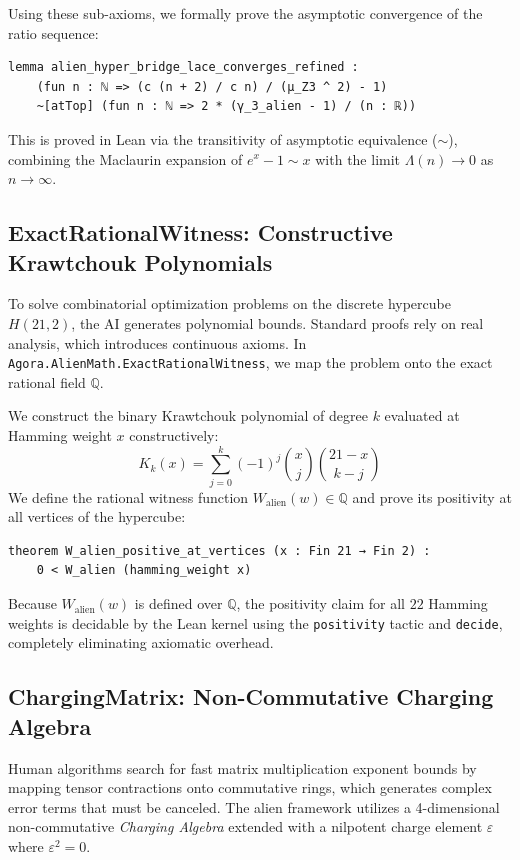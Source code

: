 \documentclass[11pt,a4paper]{article}
\begin{document}
Using these sub-axioms, we formally prove the asymptotic convergence of the ratio sequence:
\begin{lstlisting}[language=Lean]
lemma alien_hyper_bridge_lace_converges_refined :
    (fun n : ℕ => (c (n + 2) / c n) / (μ_Z3 ^ 2) - 1)
    ~[atTop] (fun n : ℕ => 2 * (γ_3_alien - 1) / (n : ℝ))
\end{lstlisting}
This is proved in Lean via the transitivity of asymptotic equivalence ($\sim$), combining the Maclaurin expansion of $e^x - 1 \sim x$ with the limit $\Lambda(n) \to 0$ as $n \to \infty$.

\subsection{ExactRationalWitness: Constructive Krawtchouk Polynomials}
To solve combinatorial optimization problems on the discrete hypercube $H(21, 2)$, the AI generates polynomial bounds. Standard proofs rely on real analysis, which introduces continuous axioms. In \texttt{Agora.AlienMath.ExactRationalWitness}, we map the problem onto the exact rational field $\mathbb{Q}$. 

We construct the binary Krawtchouk polynomial of degree $k$ evaluated at Hamming weight $x$ constructively:
\[ K_k(x) = \sum_{j=0}^k (-1)^j \binom{x}{j} \binom{21-x}{k-j} \]
We define the rational witness function $W_{\text{alien}}(w) \in \mathbb{Q}$ and prove its positivity at all vertices of the hypercube:
\begin{lstlisting}[language=Lean]
theorem W_alien_positive_at_vertices (x : Fin 21 → Fin 2) :
    0 < W_alien (hamming_weight x)
\end{lstlisting}
Because $W_{\text{alien}}(w)$ is defined over $\mathbb{Q}$, the positivity claim for all $22$ Hamming weights is decidable by the Lean kernel using the \texttt{positivity} tactic and \texttt{decide}, completely eliminating axiomatic overhead.

\subsection{ChargingMatrix: Non-Commutative Charging Algebra}
Human algorithms search for fast matrix multiplication exponent bounds by mapping tensor contractions onto commutative rings, which generates complex error terms that must be canceled. The alien framework utilizes a 4-dimensional non-commutative \textit{Charging Algebra} extended with a nilpotent charge element $\varepsilon$ where $\varepsilon^2 = 0$.
\end{document}
